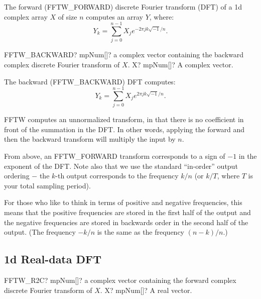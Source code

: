 \vspace{0.3cm}
The forward (\textsf{FFTW\_FORWARD}) discrete Fourier transform (DFT) of a 1d complex array $X$ of
size $n$ computes an array $Y$, where:
\begin{equation}
Y_k = \sum^{n-1}_{j=0} X_j e^{-2\pi jk \sqrt{-1}/n}.
\end{equation}


\begin{mpFunctionsExtract}
	\mpFunctionOne
	{FFTW\_BACKWARD? mpNum[]? a complex vector containing the backward complex discrete Fourier transform of $X$.}
	{X? mpNum[]? A complex vector.}
\end{mpFunctionsExtract}



The backward (\textsf{FFTW\_BACKWARD}) DFT computes:
\begin{equation}
Y_k = \sum^{n-1}_{j=0} X_j e^{2\pi jk \sqrt{-1}/n}.
\end{equation}

FFTW computes an unnormalized transform, in that there is no coefficient in front of
the summation in the DFT. In other words, applying the forward and then the backward
transform will multiply the input by $n$.

From above, an \textsf{FFTW\_FORWARD} transform corresponds to a sign of $-1$ in the exponent of the DFT. Note also that we use the standard “in-order” output ordering $-$ the $k$-th output
corresponds to the frequency $k/n$ (or $k/T$, where $T$ is your total sampling period). 

For those who like to think in terms of positive and negative frequencies, this means that the
positive frequencies are stored in the first half of the output and the negative frequencies
are stored in backwards order in the second half of the output. (The frequency $-k/n$ is the
same as the frequency $(n - k)/n$.)





\subsection{1d Real-data DFT}


\begin{mpFunctionsExtract}
	\mpFunctionOne
	{FFTW\_R2C? mpNum[]? a complex vector containing the forward complex discrete Fourier transform of $X$.}
	{X? mpNum[]? A real vector.}
\end{mpFunctionsExtract}



